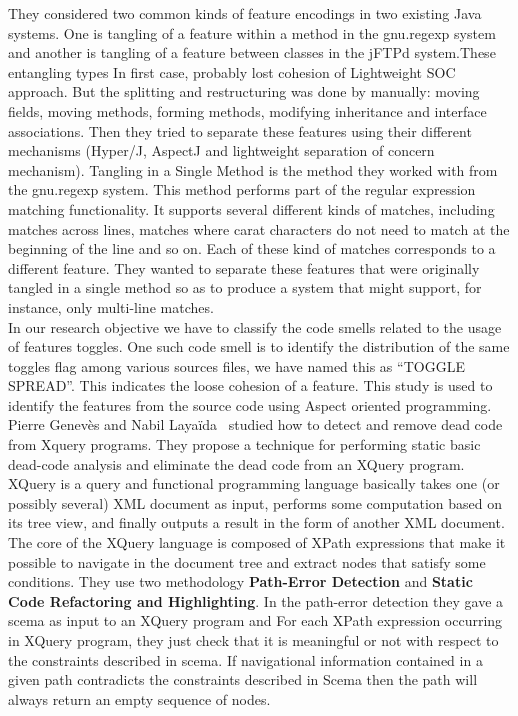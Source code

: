 \documentclass[conference]{IEEEtran}
\begin{document}
They considered two common kinds of feature encodings in two existing Java systems. One is tangling of a feature within a method in the gnu.regexp system and another is tangling of a feature between classes in the jFTPd system.These entangling types In first case, probably lost cohesion of Lightweight SOC approach. But the splitting and restructuring was done by manually: moving fields, moving methods, forming methods, modifying inheritance and interface associations. Then they tried to separate these features using their different mechanisms (Hyper/J, AspectJ and lightweight separation of concern mechanism). Tangling in a Single Method is the method they worked with from the gnu.regexp system. This method performs part of the regular expression matching functionality. It supports several different kinds of matches, including matches across lines, matches where carat characters do not need to match at the beginning of the line and so on. Each of these kind of matches corresponds to a different feature. They wanted to separate these features that were originally tangled in a single method so as to produce a system that might support, for instance, only multi-line matches.\\

In our research objective we have to classify the code smells related to the usage of features toggles. One such code smell is to identify the distribution of the same toggles flag among various sources files, we have named this as “TOGGLE SPREAD”. This indicates the loose cohesion of a feature. This study is used to identify the features from the source code using Aspect oriented programming.\\

Pierre Genevès and Nabil Layaïda~\cite{geneves2010eliminating} studied how to detect and remove dead code from Xquery programs. They propose a technique for performing static basic dead-code analysis and eliminate the dead code from an XQuery program. XQuery is a query and functional programming language basically takes one (or possibly several) XML document as input, performs some computation based on its tree view, and finally outputs a result in the form of another XML document. The core of the XQuery language is composed of XPath expressions that make it possible to navigate in the document tree and extract nodes that satisfy some conditions. They use two methodology \textbf{Path-Error Detection} and \textbf{Static Code Refactoring and Highlighting}. In the path-error detection they gave a scema as input to an XQuery program and For each XPath expression occurring in XQuery program, they just check that it is meaningful or not with respect to the constraints described in scema. If navigational information contained in a given path contradicts the constraints described in Scema then the path will always return an empty sequence of nodes.\\
\end{document}
